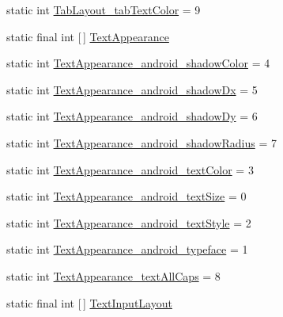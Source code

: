 \begin{DoxyCompactItemize}
\item 
static int \hyperlink{classandroid_1_1support_1_1v7_1_1appcompat_1_1R_1_1styleable_abad9974ac19ca4794058c4665a9bd530}{Tab\+Layout\+\_\+tab\+Text\+Color} = 9
\item 
static final int \mbox{[}$\,$\mbox{]} \hyperlink{classandroid_1_1support_1_1v7_1_1appcompat_1_1R_1_1styleable_a85d64ca373dd3c60f50e0e9c1a55a8da}{Text\+Appearance}
\item 
static int \hyperlink{classandroid_1_1support_1_1v7_1_1appcompat_1_1R_1_1styleable_af7af20af0fdcad16682f70d50c5bc466}{Text\+Appearance\+\_\+android\+\_\+shadow\+Color} = 4
\item 
static int \hyperlink{classandroid_1_1support_1_1v7_1_1appcompat_1_1R_1_1styleable_ac5aa04839a33de4d0ac098bc99edbb61}{Text\+Appearance\+\_\+android\+\_\+shadow\+Dx} = 5
\item 
static int \hyperlink{classandroid_1_1support_1_1v7_1_1appcompat_1_1R_1_1styleable_a72e9c1ac38f54773710d1ffbaf7b7fdd}{Text\+Appearance\+\_\+android\+\_\+shadow\+Dy} = 6
\item 
static int \hyperlink{classandroid_1_1support_1_1v7_1_1appcompat_1_1R_1_1styleable_abc79ced8270630311e6bc0c67b718446}{Text\+Appearance\+\_\+android\+\_\+shadow\+Radius} = 7
\item 
static int \hyperlink{classandroid_1_1support_1_1v7_1_1appcompat_1_1R_1_1styleable_a98071a56321cacaafd32bed6c5659547}{Text\+Appearance\+\_\+android\+\_\+text\+Color} = 3
\item 
static int \hyperlink{classandroid_1_1support_1_1v7_1_1appcompat_1_1R_1_1styleable_ad99b42fc58cdb8501069528506ff2241}{Text\+Appearance\+\_\+android\+\_\+text\+Size} = 0
\item 
static int \hyperlink{classandroid_1_1support_1_1v7_1_1appcompat_1_1R_1_1styleable_af5a1023ffeb166c92684b04104b442ac}{Text\+Appearance\+\_\+android\+\_\+text\+Style} = 2
\item 
static int \hyperlink{classandroid_1_1support_1_1v7_1_1appcompat_1_1R_1_1styleable_a622359cefc99b73e3f85dcbdcac84e1a}{Text\+Appearance\+\_\+android\+\_\+typeface} = 1
\item 
static int \hyperlink{classandroid_1_1support_1_1v7_1_1appcompat_1_1R_1_1styleable_a7084742635a0a3f3c625dce61434c8d4}{Text\+Appearance\+\_\+text\+All\+Caps} = 8
\item 
static final int \mbox{[}$\,$\mbox{]} \hyperlink{classandroid_1_1support_1_1v7_1_1appcompat_1_1R_1_1styleable_a618db13ebe8aab96f9d951a0d1c7d5bc}{Text\+Input\+Layout}
\item 

\end{DoxyCompactItemize}
